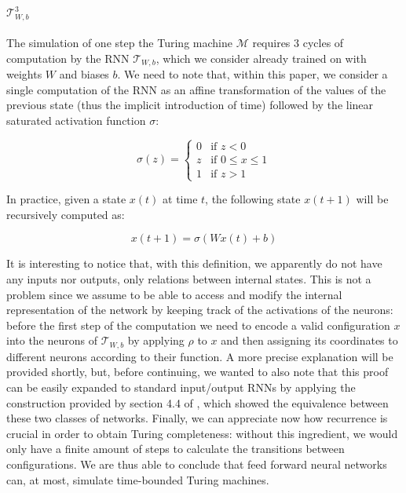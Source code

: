 \documentclass{article}
\begin{document}
\paragraph{$\mathcal{T}_{W,b}^3$} The simulation of one step the Turing machine $\mathcal{M}$ requires $3$ cycles of computation by the RNN $\mathcal{T}_{W,b}$, which we consider already trained on with weights $W$ and biases $b$. We need to note that, within this paper, we consider a single computation of the RNN as an affine transformation of the values of the previous state (thus the implicit introduction of time) followed by the linear saturated activation function $\sigma$:

    \begin{equation}
        \sigma(z)=
            \begin{cases}
                0 & \text{if } z < 0\\
                z & \text{if } 0 \leq x \leq 1\\
                1 & \text{if } z > 1
            \end{cases} 
    \end{equation}

In practice, given a state $x(t)$ at time $t$, the following state $x(t+1)$ will be recursively computed as:

    \begin{equation}\label{eq:rnnformula}
        x(t+1) = \sigma(Wx(t) + b)
    \end{equation}

It is interesting to notice that, with this definition, we apparently do not have any inputs nor outputs, only relations between internal states. This is not a problem since we assume to be able to access and modify the internal representation of the network by keeping track of the activations of the neurons: before the first step of the computation we need to encode a valid configuration $x$ into the neurons of $\mathcal{T}_{W,b}$ by applying $\rho$ to $x$ and then assigning its coordinates to different neurons according to their function. A more precise explanation will be provided shortly, but, before continuing, we wanted to also note that this proof can be easily expanded to standard input/output RNNs by applying the construction provided by section 4.4 of \cite{SIE95}, which showed the equivalence between these two classes of networks. Finally, we can appreciate now how recurrence is crucial in order to obtain Turing completeness: without this ingredient, we would only have a finite amount of steps to calculate the transitions between configurations. We are thus able to conclude that feed forward neural networks can, at most, simulate time-bounded Turing machines.
\end{document}
